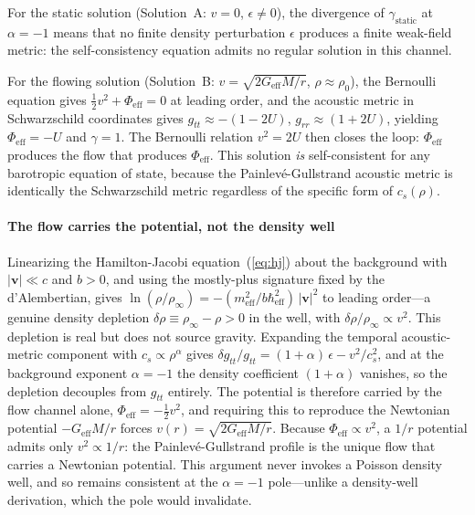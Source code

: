 \documentclass[12pt, a4paper]{article}
\begin{document}
For the static solution (Solution~A: $v = 0$, $\epsilon \neq 0$), the divergence of $\gamma_{\mathrm{static}}$ at $\alpha = -1$ means that no finite density perturbation $\epsilon$ produces a finite weak-field metric: the self-consistency equation admits no regular solution in this channel.

For the flowing solution (Solution~B: $v = \sqrt{2G_{\mathrm{eff}}M/r}$, $\rho \approx \rho_0$), the Bernoulli equation gives $\tfrac{1}{2}v^2 + \Phi_{\mathrm{eff}} = 0$ at leading order, and the acoustic metric in Schwarzschild coordinates gives $g_{tt} \approx -(1 - 2U)$, $g_{rr} \approx (1 + 2U)$, yielding $\Phi_{\mathrm{eff}} = -U$ and $\gamma = 1$. The Bernoulli relation $v^2 = 2U$ then closes the loop: $\Phi_{\mathrm{eff}}$ produces the flow that produces $\Phi_{\mathrm{eff}}$. This solution \emph{is} self-consistent for any barotropic equation of state, because the Painlev\'{e}-Gullstrand acoustic metric is identically the Schwarzschild metric regardless of the specific form of $c_s(\rho)$.

\paragraph{The flow carries the potential, not the density well}
\label{par:bernoulli}
Linearizing the Hamilton-Jacobi equation~(\ref{eq:hj}) about the background with $|\mathbf{v}| \ll c$ and $b>0$, and using the mostly-plus signature fixed by the d'Alembertian, gives $\ln(\rho/\rho_\infty) = -(m_{\mathrm{eff}}^2/b\hbar_{\mathrm{eff}}^2)\,|\mathbf{v}|^2$ to leading order---a genuine density depletion $\delta\rho \equiv \rho_\infty - \rho > 0$ in the well, with $\delta\rho/\rho_\infty \propto v^2$. This depletion is real but does not source gravity. Expanding the temporal acoustic-metric component with $c_s \propto \rho^\alpha$ gives $\delta g_{tt}/g_{tt} = (1+\alpha)\,\epsilon - v^2/c_s^2$, and at the background exponent $\alpha = -1$ the density coefficient $(1+\alpha)$ vanishes, so the depletion decouples from $g_{tt}$ entirely. The potential is therefore carried by the flow channel alone, $\Phi_{\mathrm{eff}} = -\tfrac{1}{2}v^2$, and requiring this to reproduce the Newtonian potential $-G_{\mathrm{eff}}M/r$ forces $v(r) = \sqrt{2G_{\mathrm{eff}}M/r}$. Because $\Phi_{\mathrm{eff}} \propto v^2$, a $1/r$ potential admits only $v^2 \propto 1/r$: the Painlev\'{e}-Gullstrand profile is the unique flow that carries a Newtonian potential. This argument never invokes a Poisson density well, and so remains consistent at the $\alpha = -1$ pole---unlike a density-well derivation, which the pole would invalidate.
\end{document}
